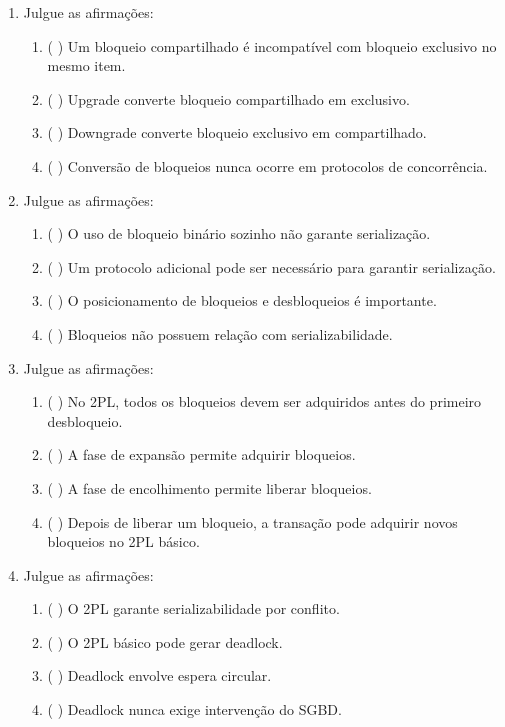 \documentclass[12pt,a4paper]{article}
\begin{document}
\begin{enumerate}[resume,label=\textbf{Q\arabic*.}]
\item Julgue as afirmações:

\begin{enumerate}[label=\alph*)]
    \item ( \quad ) Um bloqueio compartilhado é incompatível com bloqueio exclusivo no mesmo item.
    \item ( \quad ) Upgrade converte bloqueio compartilhado em exclusivo.
    \item ( \quad ) Downgrade converte bloqueio exclusivo em compartilhado.
    \item ( \quad ) Conversão de bloqueios nunca ocorre em protocolos de concorrência.
\end{enumerate}

\item Julgue as afirmações:

\begin{enumerate}[label=\alph*)]
    \item ( \quad ) O uso de bloqueio binário sozinho não garante serialização.
    \item ( \quad ) Um protocolo adicional pode ser necessário para garantir serialização.
    \item ( \quad ) O posicionamento de bloqueios e desbloqueios é importante.
    \item ( \quad ) Bloqueios não possuem relação com serializabilidade.
\end{enumerate}

\item Julgue as afirmações:

\begin{enumerate}[label=\alph*)]
    \item ( \quad ) No 2PL, todos os bloqueios devem ser adquiridos antes do primeiro desbloqueio.
    \item ( \quad ) A fase de expansão permite adquirir bloqueios.
    \item ( \quad ) A fase de encolhimento permite liberar bloqueios.
    \item ( \quad ) Depois de liberar um bloqueio, a transação pode adquirir novos bloqueios no 2PL básico.
\end{enumerate}

\item Julgue as afirmações:

\begin{enumerate}[label=\alph*)]
    \item ( \quad ) O 2PL garante serializabilidade por conflito.
    \item ( \quad ) O 2PL básico pode gerar deadlock.
    \item ( \quad ) Deadlock envolve espera circular.
    \item ( \quad ) Deadlock nunca exige intervenção do SGBD.
\end{enumerate}


\end{enumerate}
\end{document}
